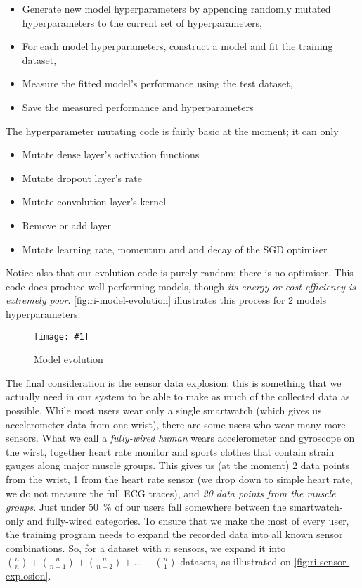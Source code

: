 \documentclass[a4paper, 10 pt, conference]{IEEEtran}
\newcommand{\fig}[3]{
  \begin{figure}[h]
    \begin{center}
        \caption{#3}
        \texttt{[image: \#1]}
        \label{fig:#2}
    \end{center}
  \end{figure}
}
\begin{document}
\begin{itemize}
\item Generate new model hyperparameters by appending randomly mutated hyperparameters to the current set of hyperparameters,
\item For each model hyperparameters, construct a model and fit the training dataset,
\item Measure the fitted model's performance using the test dataset,
\item Save the measured performance and hyperparameters
\end{itemize}

The hyperparameter mutating code is fairly basic at the moment; it can only

\begin{itemize}
\item Mutate dense layer's activation functions
\item Mutate dropout layer's rate
\item Mutate convolution layer's kernel
\item Remove or add layer
\item Mutate learning rate, momentum and and decay of the SGD optimiser
\end{itemize}

Notice also that our evolution code is purely random; there is no optimiser. This code does produce well-performing models, though \emph{its energy or cost efficiency is extremely poor}. \autoref{fig:ri-model-evolution} illustrates this process for 2 models hyperparameters.

\fig{ri-model-evolution.png}{ri-model-evolution}{Model evolution}

The final consideration is the sensor data explosion: this is something that we actually need in our system to be able to make as much of the collected data as possible. While most users wear only a single smartwatch (which gives us accelerometer data from one wrist), there are some users who wear many more sensors. What we call a \emph{fully-wired human} wears accelerometer and gyroscope on the wirst, together heart rate monitor and sports clothes that contain strain gauges along major muscle groups. This gives us (at the moment) 2 data points from the wrist, 1 from the heart rate sensor (we drop down to simple heart rate, we do not measure the full ECG traces), and \emph{20 data points from the muscle groups}. Just under \SI{50}{\percent} of our users fall somewhere between the smartwatch-only and fully-wired categories. To ensure that we make the most of every user, the training program needs to expand the recorded data into all known sensor combinations. So, for a dataset with $n$ sensors, we expand it into $\binom nn + \binom n{n-1} + \binom n{n-2} + ... + \binom n1$ datasets, as illustrated on \autoref{fig:ri-sensor-explosion}. 
\end{document}
